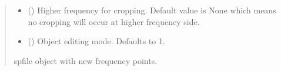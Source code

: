\documentclass[letterpaper,10pt,english]{sphinxmanual}
\begin{document}
\begin{fulllineitems}
\begin{fulllineitems}
\begin{quote}
\begin{description}
\begin{itemize}
\item {} 
\sphinxAtStartPar
{} (\sphinxstyleliteralemphasis{\sphinxupquote{, }}) \textendash{} Higher frequency for cropping. Default value is None which means no cropping will occur at higher frequency side.

\item {} 
\sphinxAtStartPar
{} (\sphinxstyleliteralemphasis{\sphinxupquote{, }}) \textendash{} Object editing mode. Defaults to \sphinxhyphen{}1.

\end{itemize}

\sphinxAtStartPar
spfile object with new frequency points.

\sphinxAtStartPar
{\hyperref[\detokenize{touchstone:touchstone.spfile}]{}}

\end{description}\end{quote}

\end{fulllineitems}



\end{fulllineitems}
\end{document}
